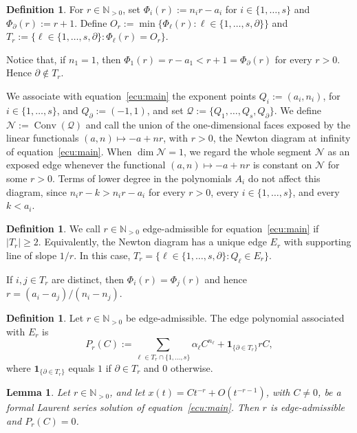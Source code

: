 \documentclass[12pt,a4paper]{amsart}
\numberwithin{theorem}{section}
\newtheorem{lemma}[theorem]{Lemma}
\theoremstyle{definition}
\newtheorem{definition}[theorem]{Definition}
\begin{document}
	\begin{definition}%
		For $r\in\mathbb{N}_{>0}$, set $\Phi_i(r):=n_ir-a_i$ for $i\in\{1,\ldots,s\}$ and $\Phi_\partial(r):=r+1$. Define $O_r:=\min\{\Phi_\ell(r):\ell\in\{1,\ldots,s,\partial\}\}$ and $T_r:=\{\ell\in\{1,\ldots,s,\partial\}:\Phi_\ell(r)=O_r\}$.
	\end{definition}
	
	Notice that, if $n_1=1$, then $\Phi_1(r)=r-a_1<r+1=\Phi_\partial(r)$ for every $r>0$. Hence $\partial\notin T_r$.
	
	We associate with equation~\eqref{ecu:main} the exponent points $Q_i:=(a_i,n_i)$, for $i\in\{1,\ldots,s\}$, and $Q_\partial:=(-1,1)$, and set $\mathcal{Q}:=\{Q_1,\ldots,Q_s,Q_\partial\}$. We define $\mathcal{N}:=\operatorname{Conv}(\mathcal{Q})$ and call the union of the one-dimensional faces exposed by the linear functionals $(a,n)\mapsto-a+nr$, with $r>0$, the Newton diagram at infinity of equation~\eqref{ecu:main}. When $\dim\mathcal N=1$, we regard the whole segment $\mathcal N$ as an exposed edge whenever the functional $(a,n)\mapsto-a+nr$ is constant on $\mathcal N$ for some $r>0$. Terms of lower degree in the polynomials $A_i$ do not affect this diagram, since $n_ir-k>n_ir-a_i$ for every $r>0$, every $i\in\{1,\ldots,s\}$, and every $k<a_i$.
	
	\begin{definition}%
		We call $r\in\mathbb{N}_{>0}$ edge-admissible for equation~\eqref{ecu:main} if $|T_r|\geq2$. Equivalently, the Newton diagram has a unique edge $E_r$ with supporting line of slope $1/r$. In this case, $T_r=\{\ell\in\{1,\ldots,s,\partial\}:Q_\ell\in E_r\}$. 
	\end{definition}
	
	If $i,j\in T_r$ are distinct, then $\Phi_i(r)=\Phi_j(r)$ and hence $r=(a_i-a_j)/(n_i-n_j)$.
	
	\begin{definition}%
		Let $r\in\mathbb{N}_{>0}$ be edge-admissible. The edge polynomial associated with $E_r$ is
		\[
		P_r(C):=\sum_{\ell\in T_r\cap\{1,\ldots,s\}}\alpha_\ell C^{n_\ell}+\mathbf{1}_{\{\partial\in T_r\}}rC,
		\]
		where $\mathbf{1}_{\{\partial\in T_r\}}$ equals $1$ if $\partial\in T_r$ and $0$ otherwise.
	\end{definition}
	
	\begin{lemma}\label{lemma:lc}
		Let $r\in\mathbb{N}_{>0}$, and let $x(t)=Ct^{-r}+O(t^{-r-1})$, with $C\neq0$, be a formal Laurent series solution of equation~\eqref{ecu:main}. Then $r$ is edge-admissible and $P_r(C)=0$.
	\end{lemma}
	
\end{document}

